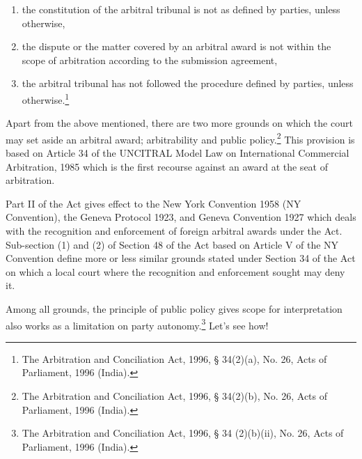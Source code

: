 \begin{multicols}{2}
\begin{enumerate}[label=$\alph*.$]
\item the constitution of the arbitral tribunal is not as defined by parties, unless otherwise,

\item the dispute or the matter covered by an arbitral award is not within the scope of arbitration according to the submission agreement,

\item the arbitral tribunal has not followed the procedure defined by parties, unless otherwise.\footnote{The Arbitration and Conciliation Act, 1996, § 34(2)(a), No. 26, Acts of Parliament, 1996 (India).}
\end{enumerate}

\noi
Apart from the above mentioned, there are two more grounds on which the court may set aside an arbitral award; arbitrability and public policy.\footnote{The Arbitration and Conciliation Act, 1996, § 34(2)(b), No. 26, Acts of Parliament, 1996 (India).} This provision is based on Article 34 of the UNCITRAL Model Law on International Commercial Arbitration, 1985 which is the first recourse against an award at the seat of arbitration.

\noi
Part II of the Act gives effect to the New York Convention 1958 (NY Convention), the Geneva
Protocol 1923, and Geneva Convention 1927 which deals with the recognition and
enforcement of foreign arbitral awards under the Act. Sub-section (1) and (2) of Section 48 of
the Act based on Article V of the NY Convention define more or less similar grounds stated
under Section 34 of the Act on which a local court where the recognition and enforcement
sought may deny it.

\noi
Among all grounds, the principle of public policy gives scope for interpretation also works as a limitation on party autonomy.\footnote{The Arbitration and Conciliation Act, 1996, § 34 (2)(b)(ii), No. 26, Acts of Parliament, 1996 (India).} Let’s see how!



\end{multicols}
